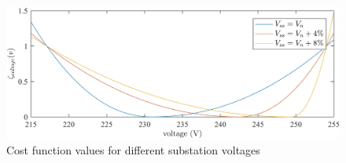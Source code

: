 \begin{figure}\centering
	\includegraphics{_chapter1/fig/voltage-deviation}
	\caption{Cost function values for different substation voltages}	
	\label{ch1:fig:voltage-deviation}
\end{figure}